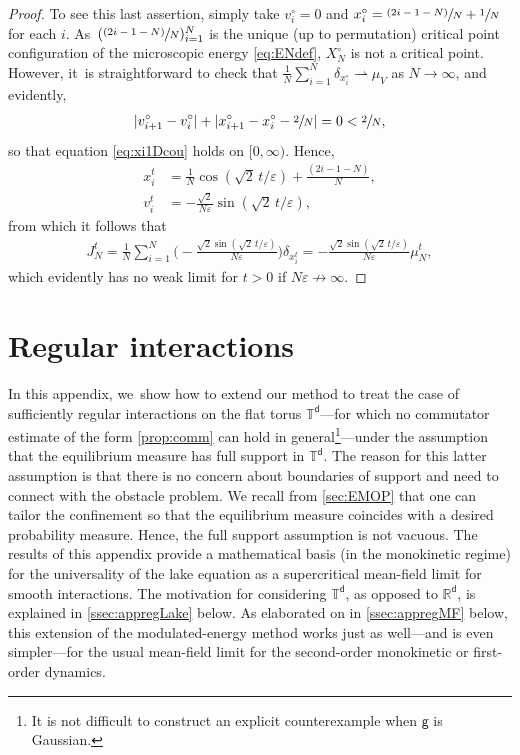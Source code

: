 \documentclass[10pt]{amsart}
\newcommand{\psfrac}[2]{\sfrac{(#1)}{#2}}
\theoremstyle{plain}
\theoremstyle{definition}
\newcommand{\R}{{\mathbb{R}}}
\newcommand{\T}{{\mathbb{T}}}
\let\vep\varepsilon
\newcommand{\XN}{X_N}
\renewcommand{\d}{\mathsf{d}}
\newcommand{\g}{{\mathsf{g}}}
\begin{document}
\begin{proof}
To see this last assertion, simply take $v_i^\circ = 0$ and $x_i^\circ = \psfrac{2i-1-N}{N} + \sfrac1N$ for each $i$. As~$(\psfrac{2i-1-N}{N})_{i=1}^N$ is the unique {(up to permutation)} critical point configuration of the microscopic energy \eqref{eq:ENdef}, $\XN^\circ$ is not a critical point. However, it~is straightforward to check that $\frac1N\sum_{i=1}^N\delta_{x_i^\circ} \rightharpoonup \mu_V$ as $N\to\infty$, and evidently,
\begin{align*}
|v_{i+1}^\circ-v_i^\circ| + |x_{i+1}^\circ-x_i^\circ-\sfrac2N| = 0 < \sfrac2N,
\end{align*}
so that equation \eqref{eq:xi1Dcou} holds on $[0,\infty)$. Hence,
\begin{align*}
x_i^t &= \frac1N\cos(\sqrt{2}\,t/\vep) + \frac{(2i-1-N)}{N}, \\
v_i^t &= -\frac{\sqrt{2}}{N\vep}\sin(\sqrt{2}\,t/\vep),
\end{align*}
from which it follows that
\begin{align*}
J_N^t = \frac1N\sum_{i=1}^N \Big(-\frac{\sqrt{2}\sin(\sqrt{2}\,t/\vep)}{N\vep}\Big)\delta_{x_i^t} = -\frac{\sqrt{2}\sin(\sqrt{2}\,t/\vep)}{N\vep}\mu_N^t,
\end{align*}
which evidently has no weak limit {for $t>0$} if $N\vep \not\to \infty$.
\end{proof}

\appendix
\section{Regular interactions}\label{sec:appreg}
In this appendix, we~show how to extend our method to treat the case of sufficiently regular interactions on the flat torus $\T^\d$---for which no commutator estimate of the form \cref{prop:comm} can hold in general\footnote{It is not difficult to construct an explicit counterexample when $\g$ is Gaussian.}---under the assumption that the equilibrium measure has full support in $\T^\d$. The reason for this latter assumption is that there is no concern about boundaries of support and need to connect with the obstacle problem. We recall from \cref{sec:EMOP} that one can tailor the confinement so that the equilibrium measure coincides with a desired probability measure. Hence, the full support assumption is not vacuous. The results of this appendix provide a mathematical basis (in the monokinetic regime) for the universality of the lake equation as a supercritical mean-field limit for smooth interactions. The motivation for considering $\T^\d$, as opposed to $\R^\d$, is explained in \cref{ssec:appregLake} below. {As elaborated on in \cref{ssec:appregMF} below, this extension of the modulated-energy method works just as well---and is even simpler---for the usual mean-field limit for the second-order monokinetic or first-order dynamics.}
\end{document}
